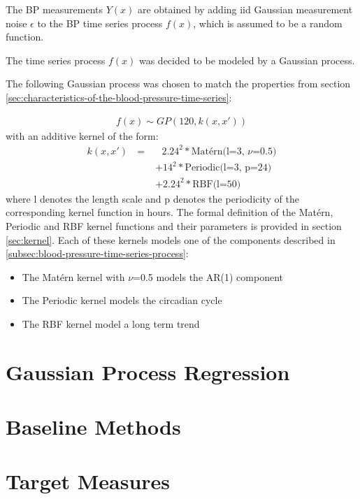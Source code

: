 The BP measurements $Y(x)$ are obtained by adding iid Gaussian measurement noise
$\epsilon$ to the BP time series process $f(x)$, which is assumed
to be a random function.

The time series process $f(x)$ was decided to be modeled by a Gaussian process.

The following Gaussian process was chosen to match the properties from
section \ref{sec:characteristics-of-the-blood-pressure-time-series}:

\begin{gather*}
    f(x) \sim GP(120, k(x,x'))
\end{gather*}
with an additive kernel of the form:
\begin{align*}
    k(x, x') \text{ } = &\text{ } 2.24^{2} * \text{Matérn(l=3, $\nu$=0.5)} \\
             &+  14^{2} * \text{Periodic(l=3, p=24)} \\
             &+  2.24^{2} * \text{RBF(l=50)}
\end{align*}
where l denotes the length scale and p denotes the periodicity
of the corresponding kernel function in hours.
The formal definition of the Matérn, Periodic and RBF kernel
functions and their parameters is provided in section \ref{sec:kernel}.
Each of these kernels models one of the components described in
\ref{subsec:blood-pressure-time-series-process}:
\begin{itemize}
    \item The Matérn kernel with $\nu$=0.5 models the AR(1) component
    \item The Periodic kernel models the circadian cycle
    \item The RBF kernel model a long term trend
\end{itemize}






\section{Gaussian Process Regression}\label{sec:methods-gaussian-process-regression}


\section{Baseline Methods}\label{sec:baseline-methods}


\section{Target Measures}\label{sec:target-measures}

